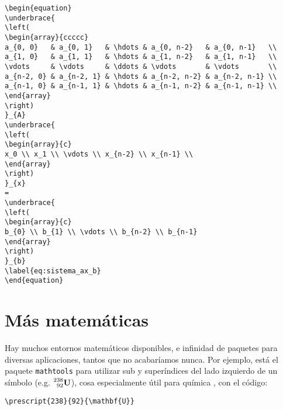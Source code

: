 \begin{lstlisting}[style=latex,caption={Uso de \texttt{array} para matrices.},label=lst:math_ax_b]
\begin{equation}
\underbrace{
\left(
\begin{array}{ccccc}
a_{0, 0}   & a_{0, 1}   & \hdots & a_{0, n-2}   & a_{0, n-1}   \\
a_{1, 0}   & a_{1, 1}   & \hdots & a_{1, n-2}   & a_{1, n-1}   \\
\vdots     & \vdots     & \ddots & \vdots       & \vdots       \\
a_{n-2, 0} & a_{n-2, 1} & \hdots & a_{n-2, n-2} & a_{n-2, n-1} \\
a_{n-1, 0} & a_{n-1, 1} & \hdots & a_{n-1, n-2} & a_{n-1, n-1} \\
\end{array}
\right)
}_{A}
\underbrace{
\left(
\begin{array}{c}
x_0 \\ x_1 \\ \vdots \\ x_{n-2} \\ x_{n-1} \\
\end{array}
\right)
}_{x}
=
\underbrace{
\left(
\begin{array}{c}
b_{0} \\ b_{1} \\ \vdots \\ b_{n-2} \\ b_{n-1}
\end{array}
\right)
}_{b}
\label{eq:sistema_ax_b}
\end{equation}
\end{lstlisting}



\section{Más matemáticas}
\label{sec:mas_matematicas}



Hay muchos entornos matemáticos disponibles, e infinidad de paquetes para diversas aplicaciones, tantos que no acabaríamos nunca. Por ejemplo, está el paquete \texttt{mathtools} para utilizar sub y superíndices del lado izquierdo de un símbolo (e.g. $\prescript{238}{92}{\mathbf{U}}$), cosa especialmente útil para química \cite{bib:overleaf_mathtools}, con el código:

\begin{lstlisting}[style=latex,numbers=none,mathescape=false]
\prescript{238}{92}{\mathbf{U}}
\end{lstlisting}

